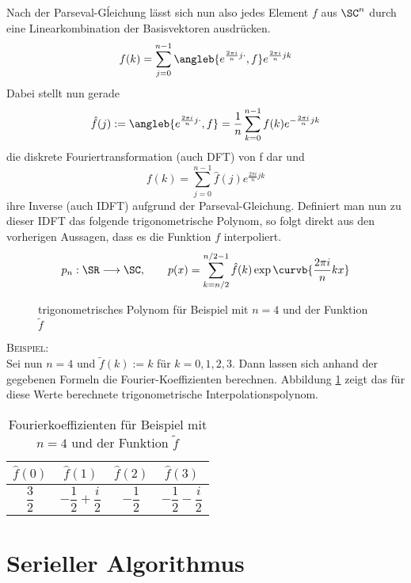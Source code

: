 		Nach der Parseval-Gĺeichung lässt sich nun also jedes Element $f$ aus $\SC^n$ durch eine Linearkombination der Basisvektoren ausdrücken.
		\[
			f(k) = \sum_{j=0}^{n-1} \angleb{e^{\frac{2\pi i}{n}j\cdot}, f} e^{\frac{2\pi i}{n}jk}
		\]
		Dabei stellt nun gerade
		\[
			\hat{f}(j) := \angleb{e^{\frac{2\pi i}{n}j\cdot}, f} = \frac{1}{n} \sum_{k=0}^{n-1} f(k)e^{-\frac{2\pi i}{n}jk}
		\]
		die diskrete Fouriertransformation (auch DFT) von f dar und 
		\[
			f(k) = \sum_{j=0}^{n-1} \hat{f}(j) e^{\frac{2\pi i}{n}jk}
		\]
		ihre Inverse (auch IDFT) aufgrund der Parseval-Gleichung.
		Definiert man nun zu dieser IDFT das folgende trigonometrische Polynom, so folgt direkt aus den vorherigen Aussagen, dass es die Funktion $f$ interpoliert.
		\[ p_n:\SR\longrightarrow\SC,\qquad p(x) = \sum_{k=n/2}^{n/2 - 1} \hat{f}(k) \exp\curvb{ \frac{2\pi i}{n}kx } \]

		\begin{figure}
			\center
			
			\caption{trigonometrisches Polynom für Beispiel mit $n=4$ und der Funktion $\tilde{f}$}
			\label{fig:example}
		\end{figure}

		\textsc{Beispiel:}\\
		Sei nun $n=4$ und $\tilde{f}(k):=k$ für $k=0,1,2,3$. Dann lassen sich anhand der gegebenen Formeln die Fourier-Koeffizienten berechnen.
		Abbildung \ref{fig:example} zeigt das für diese Werte berechnete trigonometrische Interpolationspolynom.
		\begin{table}[h]
			\center
			\begin{tabular}{c|c|c|c}
				$\hat{f}(0)$ & $\hat{f}(1)$ & $\hat{f}(2)$ & $\hat{f}(3)$ \\
				\hline \hline
				$\dfrac{3}{2}$ & $-\dfrac{1}{2}+\dfrac{i}{2}$ & $-\dfrac{1}{2}$ & $-\dfrac{1}{2}-\dfrac{i}{2}$ \\
			\end{tabular}
			\caption{Fourierkoeffizienten für Beispiel mit $n=4$ und der Funktion $\tilde{f}$}
		\end{table}
		


\section{Serieller Algorithmus} %
\label{sec:serieller_algorithmus}

